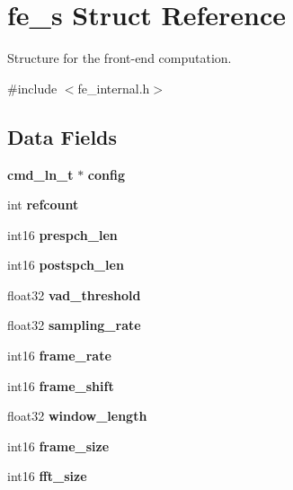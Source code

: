 \section{fe\-\_\-s Struct Reference}
\label{structfe__s}


Structure for the front-\/end computation.  




{\ttfamily \#include $<$fe\-\_\-internal.\-h$>$}

\subsection*{Data Fields}
\begin{DoxyCompactItemize}
\item 
{\bf cmd\-\_\-ln\-\_\-t} $\ast$ {\bfseries config}\label{structfe__s_abe27cd07861a2f0042f5a83f3371d0fb}

\item 
int {\bfseries refcount}\label{structfe__s_a4cdf2f8b372cfddb38a48dd770450af9}

\item 
int16 {\bfseries prespch\-\_\-len}\label{structfe__s_ac092f217405d5d273db71888bdd3930e}

\item 
int16 {\bfseries postspch\-\_\-len}\label{structfe__s_a3550f23ec53a567b1ce21923829b20b6}

\item 
float32 {\bfseries vad\-\_\-threshold}\label{structfe__s_a8c484564cca88e8aec167fe94bd27891}

\item 
float32 {\bfseries sampling\-\_\-rate}\label{structfe__s_af79879861c60083c1c0135c380bfe8e2}

\item 
int16 {\bfseries frame\-\_\-rate}\label{structfe__s_a23ca679cec8c0643dd1fa32b4e925f00}

\item 
int16 {\bfseries frame\-\_\-shift}\label{structfe__s_a62b189505f084007c3799faf3836b118}

\item 
float32 {\bfseries window\-\_\-length}\label{structfe__s_ae652f41503dd7b853bff8de89340703d}

\item 
int16 {\bfseries frame\-\_\-size}\label{structfe__s_a72b5838a48f3a10c8ba3917d245093d0}

\item 
int16 {\bfseries fft\-\_\-size}\label{structfe__s_a466b997c1f544043fb3ab6f2f89e97e7}


\end{DoxyCompactItemize}
